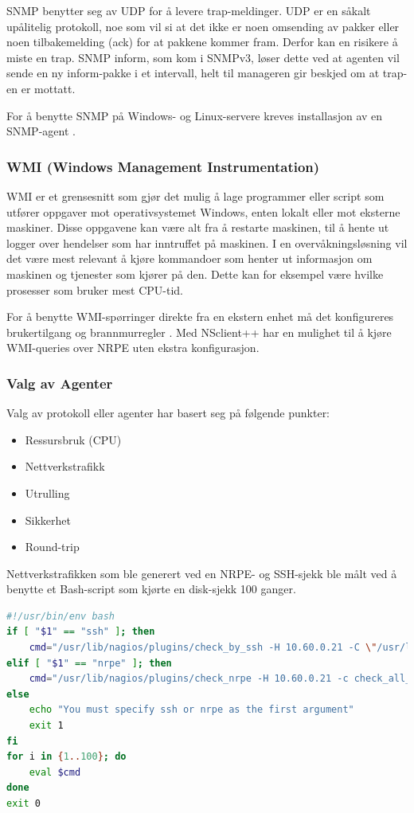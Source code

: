 SNMP benytter seg av UDP for å levere trap-meldinger. UDP er en såkalt upålitelig protokoll, noe som vil si at det ikke er noen omsending av pakker eller noen tilbakemelding (ack) for at pakkene kommer fram. Derfor kan en risikere å miste en trap. SNMP inform, som kom i SNMPv3, løser dette ved at agenten vil sende en ny inform-pakke i et intervall, helt til manageren gir beskjed om at trap-en er mottatt.

For å benytte SNMP på Windows- og Linux-servere kreves installasjon av en SNMP-agent \cite{mssnmp} \cite{netsnmp}.

\subsubsection{WMI (Windows Management Instrumentation)}
WMI er et grensesnitt som gjør det mulig å lage programmer eller script som utfører oppgaver mot operativsystemet Windows, enten lokalt eller mot eksterne maskiner. Disse oppgavene kan være alt fra å restarte maskinen, til å hente ut logger over hendelser som har inntruffet på maskinen. I en overvåkningsløsning vil det være mest relevant å kjøre kommandoer som henter ut informasjon om maskinen og tjenester som kjører på den. Dette kan for eksempel være hvilke prosesser som bruker mest CPU-tid.

For å benytte WMI-spørringer direkte fra en ekstern enhet må det konfigureres brukertilgang og brannmurregler \cite{wmiremote}. Med NSclient++ har en mulighet til å kjøre WMI-queries over NRPE uten ekstra konfigurasjon.

\subsubsection{Valg av Agenter}
Valg av protokoll eller agenter har basert seg på følgende punkter:
\begin{itemize}
	\item Ressursbruk (CPU)
	\item Nettverkstrafikk
	\item Utrulling
	\item Sikkerhet
	\item Round-trip
\end{itemize}
Nettverkstrafikken som ble generert ved en NRPE- og SSH-sjekk ble målt ved å benytte et Bash-script som kjørte en disk-sjekk 100 ganger. 

\begin{lstlisting}[style=example,language=bash]
#!/usr/bin/env bash
if [ "$1" == "ssh" ]; then
    cmd="/usr/lib/nagios/plugins/check_by_ssh -H 10.60.0.21 -C \"/usr/lib/nagios/plugins/check_disk -W 10% -C 5% -M -A\" > /dev/null"
elif [ "$1" == "nrpe" ]; then
    cmd="/usr/lib/nagios/plugins/check_nrpe -H 10.60.0.21 -c check_all_mounts -a 10,5 > /dev/null"
else
    echo "You must specify ssh or nrpe as the first argument"
    exit 1
fi
for i in {1..100}; do
    eval $cmd
done
exit 0
\end{lstlisting}


